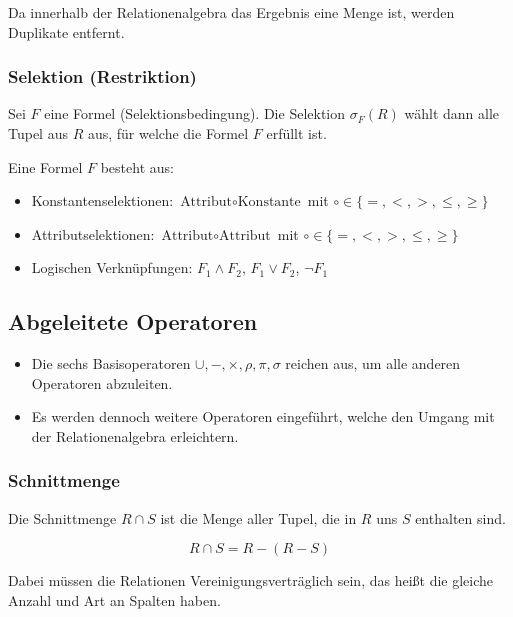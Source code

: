 				Da innerhalb der Relationenalgebra das Ergebnis eine Menge ist, werden Duplikate entfernt.

			\subsubsection{Selektion (Restriktion)} %
				Sei \(F\) eine Formel (Selektionsbedingung). Die Selektion \(\sigma_F(R)\) wählt dann alle Tupel aus \(R\) aus, für welche die Formel \(F\) erfüllt ist.

				Eine Formel \(F\) besteht aus:
				\begin{itemize}
					\item Konstantenselektionen:   \tabto{5cm} \( \text{Attribut} \circ \text{Konstante} \) mit \( \circ \in \{ =, <, >, \leq, \geq \} \)
					\item Attributselektionen:     \tabto{5cm} \( \text{Attribut} \circ \text{Attribut} \) mit \( \circ \in \{ =, <, >, \leq, \geq \} \)
					\item Logischen Verknüpfungen: \tabto{5cm} \( F_1 \land F_2 \), \( F_1 \lor F_2 \), \( \lnot F_1 \)
				\end{itemize}

		\subsection{Abgeleitete Operatoren} %
			\begin{itemize}
				\item Die sechs Basisoperatoren \( \cup, -, \times, \rho, \pi, \sigma \) reichen aus, um alle anderen Operatoren abzuleiten.
				\item Es werden dennoch weitere Operatoren eingeführt, welche den Umgang mit der Relationenalgebra erleichtern.
			\end{itemize}

			\subsubsection{Schnittmenge} %
				Die Schnittmenge \( R \cap S \) ist die Menge aller Tupel, die in \(R\) uns \(S\) enthalten sind.

				\begin{equation*}
					R \cap S = R - (R - S)
				\end{equation*}

				Dabei müssen die Relationen Vereinigungsverträglich sein, das heißt die gleiche Anzahl und Art an Spalten haben.

